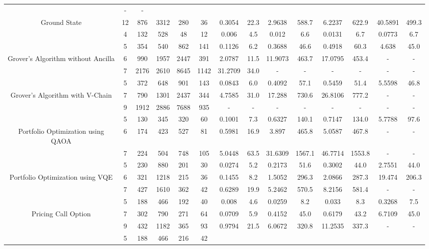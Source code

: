 \begin{table}[htb]
{\begin{tabular}{|c|c|c|c|c|c|c|c|c|c|c|c|c|c|}
 & - & -
 \\
Ground State & 
12 & 876 & 3312 & 280 & 36
 & 0.3054 & 22.3
 & 2.9638 & 588.7
 & 6.2237 & 622.9
 & 40.5891 & 499.3
 \\
 & 
4 & 132 & 528 & 48 & 12
 & 0.006 & 4.5
 & 0.012 & 6.6
 & 0.0131 & 6.7
 & 0.0773 & 6.7
 \\
\hline
 & 
5 & 354 & 540 & 862 & 141
 & 0.1126 & 6.2
 & 0.3688 & 46.6
 & 0.4918 & 60.3
 & 4.638 & 45.0
 \\
Grover's Algorithm without Ancilla & 
6 & 990 & 1957 & 2447 & 391
 & 2.0787 & 11.5
 & 11.9073 & 463.7
 & 17.0795 & 453.4
 & - & -
 \\
 & 
7 & 2176 & 2610 & 8645 & 1142
 & 31.2709 & 34.0
 & - & -
 & - & -
 & - & -
 \\
\hline
 & 
5 & 372 & 648 & 901 & 143
 & 0.0843 & 6.0
 & 0.4092 & 57.1
 & 0.5459 & 51.4
 & 5.5598 & 46.8
 \\
Grover's Algorithm with V-Chain & 
7 & 790 & 1301 & 2437 & 344
 & 4.7585 & 31.0
 & 17.288 & 730.6
 & 26.8106 & 777.2
 & - & -
 \\
 & 
9 & 1912 & 2886 & 7688 & 935
 & - & -
 & - & -
 & - & -
 & - & -
 \\
\hline
 & 
5 & 130 & 345 & 320 & 60
 & 0.1001 & 7.3
 & 0.6327 & 140.1
 & 0.7147 & 134.0
 & 5.7788 & 97.6
 \\
Portfolio Optimization using QAOA & 
6 & 174 & 423 & 527 & 81
 & 0.5981 & 16.9
 & 3.897 & 465.8
 & 5.0587 & 467.8
 & - & -
 \\
 & 
7 & 224 & 504 & 748 & 105
 & 5.0448 & 63.5
 & 31.6309 & 1567.1
 & 46.7714 & 1553.8
 & - & -
 \\
\hline
 & 
5 & 230 & 880 & 201 & 30
 & 0.0274 & 5.2
 & 0.2173 & 51.6
 & 0.3002 & 44.0
 & 2.7551 & 44.0
 \\
Portfolio Optimization using VQE & 
6 & 321 & 1218 & 215 & 36
 & 0.1455 & 8.2
 & 1.5052 & 296.3
 & 2.0866 & 287.3
 & 19.474 & 206.3
 \\
 & 
7 & 427 & 1610 & 362 & 42
 & 0.6289 & 19.9
 & 5.2462 & 570.5
 & 8.2156 & 581.4
 & - & -
 \\
\hline
 & 
5 & 188 & 466 & 192 & 40
 & 0.008 & 4.6
 & 0.0259 & 8.2
 & 0.033 & 8.3
 & 0.3268 & 7.5
 \\
Pricing Call Option & 
7 & 302 & 790 & 271 & 64
 & 0.0709 & 5.9
 & 0.4152 & 45.0
 & 0.6179 & 43.2
 & 6.7109 & 45.0
 \\
 & 
9 & 432 & 1182 & 365 & 93
 & 0.9794 & 21.5
 & 6.0672 & 320.8
 & 11.2535 & 337.3
 & - & -
 \\
\hline
 & 
5 & 188 & 466 & 216 & 42

\end{tabular}}
\end{table}
